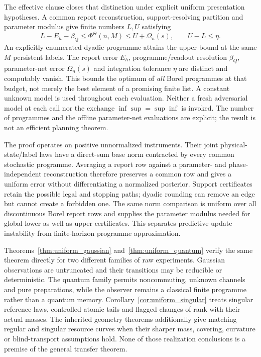 The effective clause closes that distinction under explicit uniform presentation hypotheses. A common report reconstruction, support-resolving partition and parameter modulus give finite numbers $L,U$ satisfying
\[
 L-E_h-\beta_Q\le \Phi^\Theta(n,M)\le U+\Omega_n(s),
 \qquad U-L\le\eta.
\]
An explicitly enumerated dyadic programme attains the upper bound at the same $M$ persistent labels. The report error $E_h$, programme/readout resolution $\beta_Q$, parameter-net error $\Omega_n(s)$ and integration tolerance $\eta$ are distinct and computably vanish. This bounds the optimum of \emph{all} Borel programmes at that budget, not merely the best element of a promising finite list. A constant unknown model is used throughout each evaluation. Neither a fresh adversarial model at each call nor the exchange $\inf\sup=\sup\inf$ is invoked. The number of programmes and the offline parameter-net evaluations are explicit; the result is not an efficient planning theorem.

The proof operates on positive unnormalized instruments. Their joint physical-state/label laws have a direct-sum base norm contracted by every common stochastic programme. Averaging a report row against a parameter- and phase-independent reconstruction therefore preserves a common row and gives a uniform error without differentiating a normalized posterior. Support certificates retain the possible legal and stopping paths; dyadic rounding can remove an edge but cannot create a forbidden one. The same norm comparison is uniform over all discontinuous Borel report rows and supplies the parameter modulus needed for global lower as well as upper certificates. This separates predictive-update instability from finite-horizon programme approximation.

Theorems~\ref{thm:uniform_gaussian} and~\ref{thm:uniform_quantum} verify the same theorem directly for two different families of raw experiments. Gaussian observations are untruncated and their transitions may be reducible or deterministic. The quantum family permits noncommuting, unknown channels and pure preparations, while the observer remains a classical finite programme rather than a quantum memory. Corollary~\ref{cor:uniform_singular} treats singular reference laws, controlled atomic tails and flagged changes of rank with their actual masses. The inherited geometry theorems additionally give matching regular and singular resource curves when their sharper mass, covering, curvature or blind-transport assumptions hold. None of those realization conclusions is a premise of the general transfer theorem.


